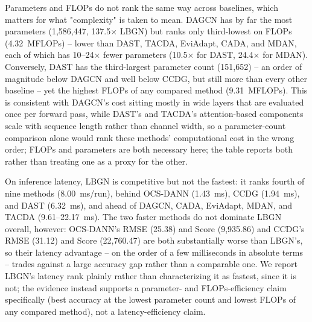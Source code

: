Parameters and FLOPs do not rank the same way across baselines, which
matters for what "complexity" is taken to mean. DAGCN has by far the most
parameters (1{,}586{,}447, 137.5$\times$ LBGN) but ranks only third-lowest on
FLOPs (4.32~MFLOPs) -- lower than DAST, TACDA, EviAdapt, CADA, and MDAN,
each of which has 10--24$\times$ fewer parameters (10.5$\times$ for DAST,
24.4$\times$ for MDAN). Conversely, DAST has the
third-largest parameter count (151{,}652) -- an order of magnitude below
DAGCN and well below CCDG, but still more than every other baseline -- yet
the highest FLOPs of any compared method (9.31~MFLOPs). This is consistent with
DAGCN's cost sitting mostly in wide layers that are evaluated once per
forward pass, while DAST's and TACDA's attention-based components scale
with sequence length rather than channel width, so a parameter-count
comparison alone would rank these methods' computational cost in the wrong
order; FLOPs and parameters are both necessary here; the table reports both
rather than treating one as a proxy for the other.

On inference latency, LBGN is competitive but not the fastest: it ranks
fourth of nine methods (8.00~ms/run), behind OCS-DANN (1.43~ms), CCDG
(1.94~ms), and DAST (6.32~ms), and ahead of DAGCN, CADA, EviAdapt, MDAN, and
TACDA (9.61--22.17~ms). The two faster methods do not dominate LBGN
overall, however: OCS-DANN's RMSE (25.38) and Score (9{,}935.86) and CCDG's
RMSE (31.12) and Score (22{,}760.47) are both substantially worse than
LBGN's, so their latency advantage -- on the order of a few milliseconds in
absolute terms -- trades against a large accuracy gap rather than a
comparable one. We report LBGN's latency rank plainly rather than
characterizing it as fastest, since it is not; the evidence instead supports
a parameter- and FLOPs-efficiency claim specifically (best accuracy at the
lowest parameter count and lowest FLOPs of any compared method), not a
latency-efficiency claim.

